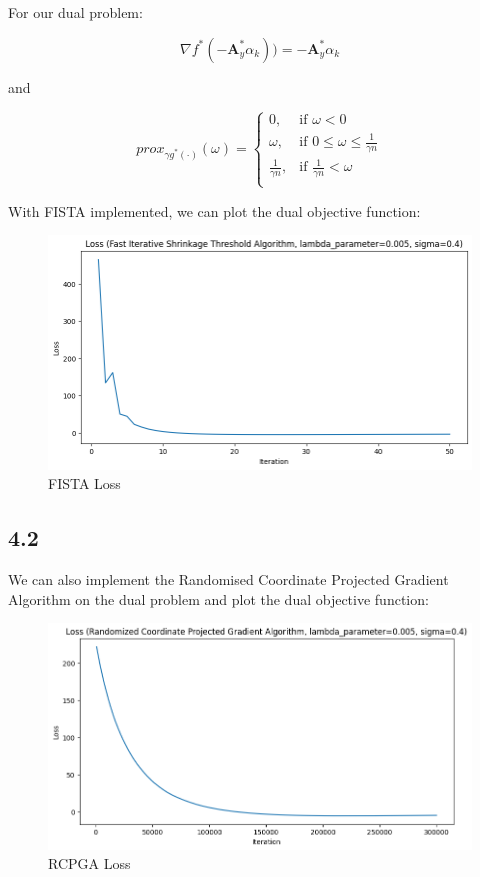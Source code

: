 \documentclass[12pt]{article}
\begin{document}
For our dual problem:

\[\nabla f^*(-\textbf{A}_y^* \alpha_{k})) = -\textbf{A}_y^* \alpha_{k}\]

and

\[prox_{\gamma g^*(\cdot)}(\omega) = \begin{cases}
      0, &  \text{if } \omega < 0\\
      \omega, &  \text{if } 0 \leq \omega \leq \frac{1}{\gamma n} \\
      \frac{1}{\gamma n}, & \text{if } \frac{1}{\gamma n} < \omega \\
   \end{cases}\]

With FISTA implemented, we can plot the dual objective function:

\begin{figure}[h]
\centering
\includegraphics[scale=0.3]{outputs/part_4/fista-loss}
\caption{FISTA Loss}
\label{fig:}
\end{figure}


\subsection*{4.2}

We can also implement the Randomised Coordinate Projected Gradient Algorithm on the dual problem and plot the dual objective function:

\begin{figure}[h]
\centering
\includegraphics[scale=0.3]{outputs/part_4/rcpga-loss}
\caption{RCPGA Loss}
\label{fig:}
\end{figure}
\newpage
\end{document}
